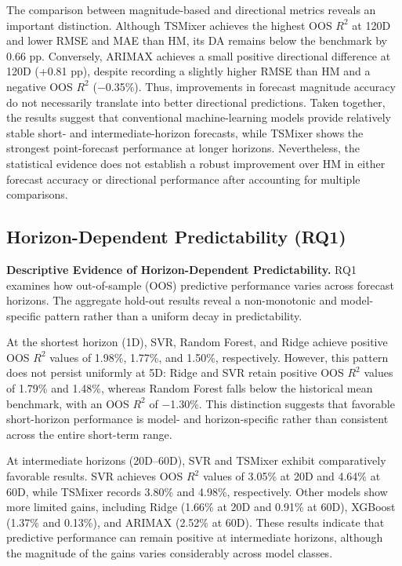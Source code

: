 \documentclass[12pt,twoside]{ord}
\makeatletter
\providecommand{\FloatBarrier}{\par\ifx\@deferlist\@empty\else\clearpage\fi}
\makeatother
\begin{document}
The comparison between magnitude-based and directional metrics reveals an important distinction. Although TSMixer achieves the highest OOS $R^2$ at 120D and lower RMSE and MAE than HM, its DA remains below the benchmark by 0.66 pp. Conversely, ARIMAX achieves a small positive directional difference at 120D (+0.81 pp), despite recording a slightly higher RMSE than HM and a negative OOS $R^2$ ($-$0.35\%). Thus, improvements in forecast magnitude accuracy do not necessarily translate into better directional predictions. Taken together, the results suggest that conventional machine-learning models provide relatively stable short- and intermediate-horizon forecasts, while TSMixer shows the strongest point-forecast performance at longer horizons. Nevertheless, the statistical evidence does not establish a robust improvement over HM in either forecast accuracy or directional performance after accounting for multiple comparisons.

\FloatBarrier
\subsection{Horizon-Dependent Predictability (RQ1)}

\noindent\textbf{Descriptive Evidence of Horizon-Dependent Predictability.} RQ1 examines how out-of-sample (OOS) predictive performance varies across forecast horizons. The aggregate hold-out results reveal a non-monotonic and model-specific pattern rather than a uniform decay in predictability.

At the shortest horizon (1D), SVR, Random Forest, and Ridge achieve positive OOS $R^2$ values of 1.98\%, 1.77\%, and 1.50\%, respectively. However, this pattern does not persist uniformly at 5D: Ridge and SVR retain positive OOS $R^2$ values of 1.79\% and 1.48\%, whereas Random Forest falls below the historical mean benchmark, with an OOS $R^2$ of $-$1.30\%. This distinction suggests that favorable short-horizon performance is model- and horizon-specific rather than consistent across the entire short-term range.

At intermediate horizons (20D--60D), SVR and TSMixer exhibit comparatively favorable results. SVR achieves OOS $R^2$ values of 3.05\% at 20D and 4.64\% at 60D, while TSMixer records 3.80\% and 4.98\%, respectively. Other models show more limited gains, including Ridge (1.66\% at 20D and 0.91\% at 60D), XGBoost (1.37\% and 0.13\%), and ARIMAX (2.52\% at 60D). These results indicate that predictive performance can remain positive at intermediate horizons, although the magnitude of the gains varies considerably across model classes.
\end{document}
